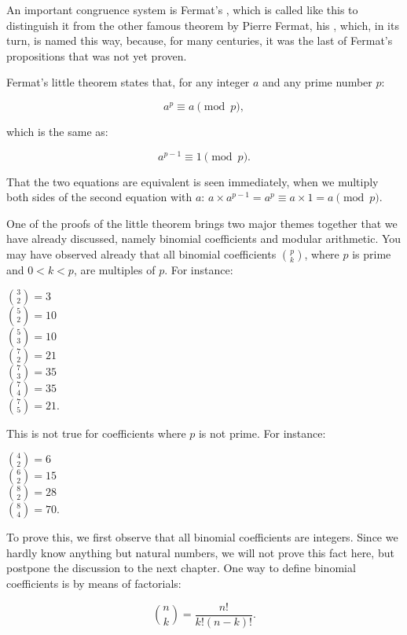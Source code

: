\documentclass{scrreprt}
\begin{document}
An important congruence system is
Fermat's ,
which is called like this to distinguish it
from the other famous theorem by Pierre Fermat,
his , which, in its turn,
is named this way, because, for many centuries,
it was the last of Fermat's propositions
that was not yet proven.

Fermat's little theorem states that,
for any integer $a$ and any prime number $p$:

\begin{equation}
a^p \equiv a \pmod{p},
\end{equation}

which is the same as:

\begin{equation}
a^{p-1} \equiv 1 \pmod{p}.
\end{equation}

That the two equations are equivalent
is seen immediately,
when we multiply both sides 
of the second equation with $a$:
$a \times a^{p-1} = a^p \equiv a \times 1 = a \pmod{p}$.

One of the proofs of the little theorem brings two major themes
together that we have already discussed,
namely binomial coefficients and modular arithmetic.
You may have observed already that 
all binomial coefficients $\binom{p}{k}$,
where $p$ is prime and $0 < k < p$, are multiples of $p$.
For instance:

$\binom{3}{2} = 3$\\
$\binom{5}{2} = 10$\\
$\binom{5}{3} = 10$\\
$\binom{7}{2} = 21$\\
$\binom{7}{3} = 35$\\
$\binom{7}{4} = 35$\\
$\binom{7}{5} = 21$.

This is not true for coefficients
where $p$ is not prime. For instance:

$\binom{4}{2} = 6$\\
$\binom{6}{2} = 15$\\
$\binom{8}{2} = 28$\\
$\binom{8}{4} = 70$.

To prove this, we first observe
that all binomial coefficients are integers.
Since we hardly know anything but natural numbers,
we will not prove this fact here,
but postpone the discussion to the next chapter.
One way to define binomial coefficients 
is by means of factorials:

\begin{equation}\label{eqCon_binom1}
\binom{n}{k} = \frac{n!}{k!(n-k)!}.
\end{equation}
\end{document}
